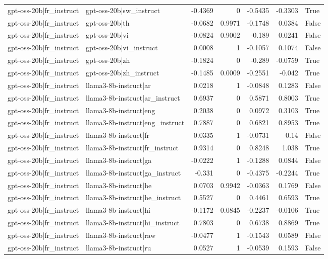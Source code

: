 \begin{table}
\begin{tabular}{l l r r r r l}
gpt-oss-20b|fr_instruct & gpt-oss-20b|sw_instruct & -0.4369 & 0 & -0.5435 & -0.3303 & True \\
gpt-oss-20b|fr_instruct & gpt-oss-20b|th & -0.0682 & 0.9971 & -0.1748 & 0.0384 & False \\
gpt-oss-20b|fr_instruct & gpt-oss-20b|vi & -0.0824 & 0.9002 & -0.189 & 0.0241 & False \\
gpt-oss-20b|fr_instruct & gpt-oss-20b|vi_instruct & 0.0008 & 1 & -0.1057 & 0.1074 & False \\
gpt-oss-20b|fr_instruct & gpt-oss-20b|zh & -0.1824 & 0 & -0.289 & -0.0759 & True \\
gpt-oss-20b|fr_instruct & gpt-oss-20b|zh_instruct & -0.1485 & 0.0009 & -0.2551 & -0.042 & True \\
gpt-oss-20b|fr_instruct & llama3-8b-instruct|ar & 0.0218 & 1 & -0.0848 & 0.1283 & False \\
gpt-oss-20b|fr_instruct & llama3-8b-instruct|ar_instruct & 0.6937 & 0 & 0.5871 & 0.8003 & True \\
gpt-oss-20b|fr_instruct & llama3-8b-instruct|eng & 0.2038 & 0 & 0.0972 & 0.3103 & True \\
gpt-oss-20b|fr_instruct & llama3-8b-instruct|eng_instruct & 0.7887 & 0 & 0.6821 & 0.8953 & True \\
gpt-oss-20b|fr_instruct & llama3-8b-instruct|fr & 0.0335 & 1 & -0.0731 & 0.14 & False \\
gpt-oss-20b|fr_instruct & llama3-8b-instruct|fr_instruct & 0.9314 & 0 & 0.8248 & 1.038 & True \\
gpt-oss-20b|fr_instruct & llama3-8b-instruct|ga & -0.0222 & 1 & -0.1288 & 0.0844 & False \\
gpt-oss-20b|fr_instruct & llama3-8b-instruct|ga_instruct & -0.331 & 0 & -0.4375 & -0.2244 & True \\
gpt-oss-20b|fr_instruct & llama3-8b-instruct|he & 0.0703 & 0.9942 & -0.0363 & 0.1769 & False \\
gpt-oss-20b|fr_instruct & llama3-8b-instruct|he_instruct & 0.5527 & 0 & 0.4461 & 0.6593 & True \\
gpt-oss-20b|fr_instruct & llama3-8b-instruct|hi & -0.1172 & 0.0845 & -0.2237 & -0.0106 & True \\
gpt-oss-20b|fr_instruct & llama3-8b-instruct|hi_instruct & 0.7803 & 0 & 0.6738 & 0.8869 & True \\
gpt-oss-20b|fr_instruct & llama3-8b-instruct|raw & -0.0477 & 1 & -0.1543 & 0.0589 & False \\
gpt-oss-20b|fr_instruct & llama3-8b-instruct|ru & 0.0527 & 1 & -0.0539 & 0.1593 & False \\

\end{tabular}
\end{table}
